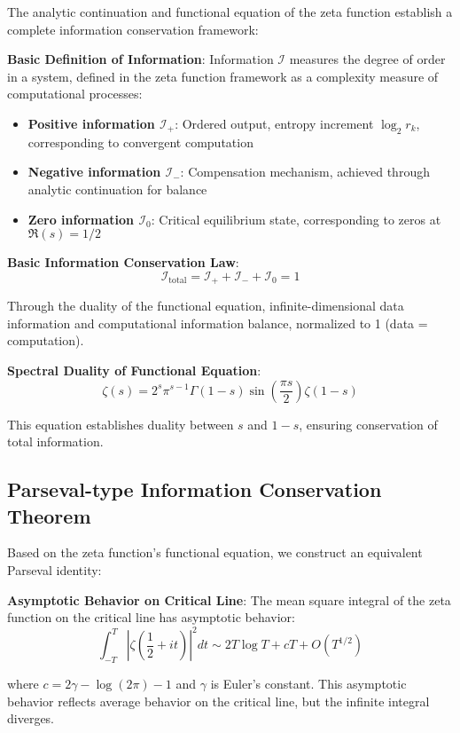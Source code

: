 \documentclass[11pt]{article}
\begin{document}
The analytic continuation and functional equation of the zeta function establish a complete information conservation framework:

\textbf{Basic Definition of Information}:
Information $\mathcal{I}$ measures the degree of order in a system, defined in the zeta function framework as a complexity measure of computational processes:

\begin{itemize}
\item \textbf{Positive information $\mathcal{I}_+$}: Ordered output, entropy increment $\log_2 r_k$, corresponding to convergent computation
\item \textbf{Negative information $\mathcal{I}_-$}: Compensation mechanism, achieved through analytic continuation for balance
\item \textbf{Zero information $\mathcal{I}_0$}: Critical equilibrium state, corresponding to zeros at $\Re(s)=1/2$
\end{itemize}

\textbf{Basic Information Conservation Law}:
$$\mathcal{I}_{\text{total}} = \mathcal{I}_+ + \mathcal{I}_- + \mathcal{I}_0 = 1$$

Through the duality of the functional equation, infinite-dimensional data information and computational information balance, normalized to 1 (data = computation).

\textbf{Spectral Duality of Functional Equation}:
$$\zeta(s) = 2^s \pi^{s-1} \Gamma(1-s) \sin\left(\frac{\pi s}{2}\right) \zeta(1-s)$$

This equation establishes duality between $s$ and $1-s$, ensuring conservation of total information.

\subsection{Parseval-type Information Conservation Theorem}

Based on the zeta function's functional equation, we construct an equivalent Parseval identity:

\textbf{Asymptotic Behavior on Critical Line}:
The mean square integral of the zeta function on the critical line has asymptotic behavior:
$$\int_{-T}^{T} |\zeta\left(\frac{1}{2} + it\right)|^2 dt \sim 2T \log T + c T + O(T^{1/2})$$

where $c = 2\gamma - \log(2\pi) - 1$ and $\gamma$ is Euler's constant. This asymptotic behavior reflects average behavior on the critical line, but the infinite integral diverges.
\end{document}
